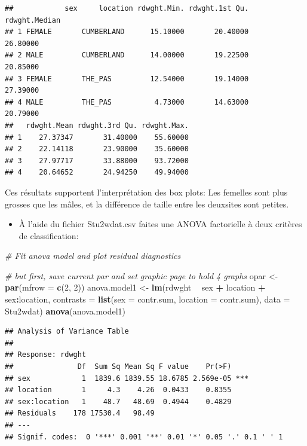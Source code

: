 \documentclass[12pt,]{book}
\newenvironment{Shaded}{\begin{snugshade}}{\end{snugshade}}
\newcommand{\CommentTok}[1]{\textcolor[rgb]{0.37,0.37,0.37}{\textit{#1}}}
\newcommand{\DataTypeTok}[1]{\textcolor[rgb]{0.27,0.27,0.27}{#1}}
\newcommand{\DecValTok}[1]{\textcolor[rgb]{0.06,0.06,0.06}{#1}}
\newcommand{\KeywordTok}[1]{\textcolor[rgb]{0.27,0.27,0.27}{\textbf{#1}}}
\newcommand{\NormalTok}[1]{#1}
\newcommand{\OperatorTok}[1]{\textcolor[rgb]{0.43,0.43,0.43}{\textbf{#1}}}
\newcommand{\StringTok}[1]{\textcolor[rgb]{0.5,0.5,0.5}{#1}}
\providecommand{\tightlist}{%
  \setlength{\itemsep}{0pt}\setlength{\parskip}{0pt}}
\begin{document}
\begin{verbatim}
##            sex     location rdwght.Min. rdwght.1st Qu. rdwght.Median
## 1 FEMALE       CUMBERLAND      15.10000       20.40000      26.80000
## 2 MALE         CUMBERLAND      14.00000       19.22500      20.85000
## 3 FEMALE       THE_PAS         12.54000       19.14000      27.39000
## 4 MALE         THE_PAS          4.73000       14.63000      20.79000
##   rdwght.Mean rdwght.3rd Qu. rdwght.Max.
## 1    27.37347       31.40000    55.60000
## 2    22.14118       23.90000    35.60000
## 3    27.97717       33.88000    93.72000
## 4    20.64652       24.94250    49.94000
\end{verbatim}

Ces résultats supportent l'interprétation des box plots: Les femelles sont plus grosses que les mâles, et la différence de taille entre les deuxsites sont petites.

\begin{itemize}
\tightlist
\item
  À l'aide du fichier Stu2wdat.csv faites une ANOVA factorielle à
  deux critères de classification:
\end{itemize}

\begin{Shaded}
\begin{Highlighting}[]
\CommentTok{# Fit anova model and plot residual diagnostics}


\CommentTok{# but first, save current par and set graphic page to hold 4 graphs}
\NormalTok{opar <-}\StringTok{ }\KeywordTok{par}\NormalTok{(}\DataTypeTok{mfrow =} \KeywordTok{c}\NormalTok{(}\DecValTok{2}\NormalTok{, }\DecValTok{2}\NormalTok{))}
\NormalTok{anova.model1 <-}\StringTok{ }\KeywordTok{lm}\NormalTok{(rdwght }\OperatorTok{~}\StringTok{ }\NormalTok{sex }\OperatorTok{+}\StringTok{ }\NormalTok{location }\OperatorTok{+}\StringTok{ }\NormalTok{sex}\OperatorTok{:}\NormalTok{location,}
\DataTypeTok{contrasts =} \KeywordTok{list}\NormalTok{(}\DataTypeTok{sex =}\NormalTok{ contr.sum, }\DataTypeTok{location =}\NormalTok{ contr.sum),}
\DataTypeTok{data =}\NormalTok{ Stu2wdat)}
\KeywordTok{anova}\NormalTok{(anova.model1)}
\end{Highlighting}
\end{Shaded}

\begin{verbatim}
## Analysis of Variance Table
## 
## Response: rdwght
##               Df  Sum Sq Mean Sq F value    Pr(>F)    
## sex            1  1839.6 1839.55 18.6785 2.569e-05 ***
## location       1     4.3    4.26  0.0433    0.8355    
## sex:location   1    48.7   48.69  0.4944    0.4829    
## Residuals    178 17530.4   98.49                      
## ---
## Signif. codes:  0 '***' 0.001 '**' 0.01 '*' 0.05 '.' 0.1 ' ' 1
\end{verbatim}
\end{document}
